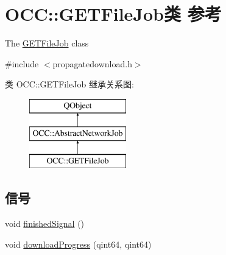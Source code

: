 \hypertarget{class_o_c_c_1_1_g_e_t_file_job}{}\section{O\+CC\+:\+:G\+E\+T\+File\+Job类 参考}
\label{class_o_c_c_1_1_g_e_t_file_job}


The \hyperlink{class_o_c_c_1_1_g_e_t_file_job}{G\+E\+T\+File\+Job} class  




{\ttfamily \#include $<$propagatedownload.\+h$>$}

类 O\+CC\+:\+:G\+E\+T\+File\+Job 继承关系图\+:\begin{figure}[H]
\begin{center}
\leavevmode
\includegraphics[height=3.000000cm]{class_o_c_c_1_1_g_e_t_file_job}
\end{center}
\end{figure}
\subsection*{信号}
\begin{DoxyCompactItemize}
\item 
void \hyperlink{class_o_c_c_1_1_g_e_t_file_job_a7d6682c99cf34159a8f545cbb29c5ea6}{finished\+Signal} ()
\item 
void \hyperlink{class_o_c_c_1_1_g_e_t_file_job_a4db78893031cc5b4859dd3dd72c36f56}{download\+Progress} (qint64, qint64)
\end{DoxyCompactItemize}
